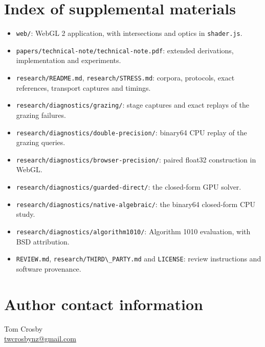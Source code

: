 \documentclass{jcgt}
\providecommand{\passthrough}[1]{#1}
\providecommand{\tightlist}{\setlength{\itemsep}{0pt}\setlength{\parskip}{0pt}}
\begin{document}
\small


\section*{Index of supplemental
materials}\label{index-of-supplemental-materials}

\begin{itemize}
\tightlist
\item
  \passthrough{\lstinline!web/!}: WebGL 2 application, with
  intersections and optics in \passthrough{\lstinline!shader.js!}.
\item
  \passthrough{\lstinline!papers/technical-note/technical-note.pdf!}:
  extended derivations, implementation and experiments.
\item
  \passthrough{\lstinline!research/README.md!},
  \passthrough{\lstinline!research/STRESS.md!}: corpora, protocols,
  exact references, transport captures and timings.
\item
  \passthrough{\lstinline!research/diagnostics/grazing/!}: stage
  captures and exact replays of the grazing failures.
\item
  \passthrough{\lstinline!research/diagnostics/double-precision/!}:
  binary64 CPU replay of the grazing queries.
\item
  \passthrough{\lstinline!research/diagnostics/browser-precision/!}:
  paired float32 construction in WebGL.
\item
  \passthrough{\lstinline!research/diagnostics/guarded-direct/!}: the
  closed-form GPU solver.
\item
  \passthrough{\lstinline!research/diagnostics/native-algebraic/!}: the
  binary64 closed-form CPU study.
\item
  \passthrough{\lstinline!research/diagnostics/algorithm1010/!}:
  Algorithm 1010 evaluation, with BSD attribution.
\item
  \passthrough{\lstinline!REVIEW.md!},
  \passthrough{\lstinline!research/THIRD\_PARTY.md!} and
  \passthrough{\lstinline!LICENSE!}: review instructions and software
  provenance.
\end{itemize}

\section*{Author contact information}
Tom Crosby\\
\href{mailto:twcrosbynz@gmail.com}{twcrosbynz@gmail.com}
\end{document}

